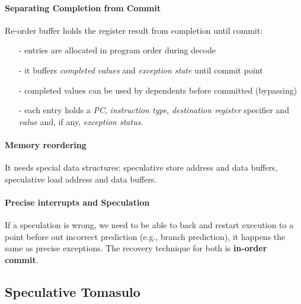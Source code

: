 \paragraph{Separating Completion from Commit} Re-order buffer holds the register result from completion until commit:
\begin{itemize}[noitemsep]
    \item[-] entries are allocated in program order during decode
    \item[-] it buffers \textit{completed values} and \textit{exception state} until commit point
    \item[-] completed values can be used by dependents before committed (bypassing)
    \item[-] each entry holds a \textit{PC}, \textit{instruction type}, \textit{destination register} specifier and
    \textit{value} and, if any, \textit{exception status}.
\end{itemize}


\paragraph{Memory reordering} It needs special data structures:
speculative store address and data buffers, speculative load address and data buffers.

\paragraph{Precise interrupts and Speculation} If a speculation is wrong, we need to be able to back and restart
execution to a point before out incorrect prediction (e.g., branch prediction), it happens the same as precise
exceptions.
The recovery technique for both is \textbf{in-order commit}.


\subsection{Speculative Tomasulo}\label{subsec:speculative-tomasulo}
